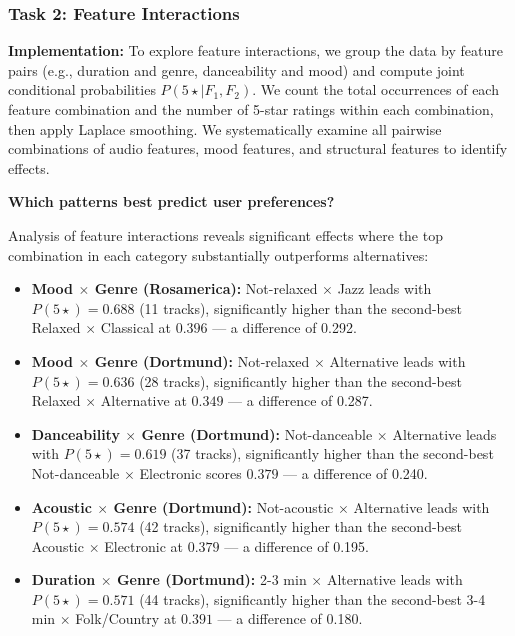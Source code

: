 \documentclass[12pt,a4paper]{article}
\begin{document}
\subsubsection{Task 2: Feature Interactions}

\textbf{Implementation:} To explore feature interactions, we group the data by feature pairs (e.g., duration and genre, danceability and mood) and compute joint conditional probabilities $P(5\star \mid F_1, F_2)$. We count the total occurrences of each feature combination and the number of 5-star ratings within each combination, then apply Laplace smoothing. We systematically examine all pairwise combinations of audio features, mood features, and structural features to identify effects.

\textbf{Which patterns best predict user preferences?}

Analysis of feature interactions reveals significant effects where the top combination in each category substantially outperforms alternatives:

\begin{itemize}
    \item \textbf{Mood $\times$ Genre (Rosamerica):} Not-relaxed $\times$ Jazz leads with $P(5\star) = 0.688$ (11 tracks), significantly higher than the second-best Relaxed $\times$ Classical at $0.396$ --- a difference of 0.292.
    
    \item \textbf{Mood $\times$ Genre (Dortmund):} Not-relaxed $\times$ Alternative leads with $P(5\star) = 0.636$ (28 tracks), significantly higher than the second-best Relaxed $\times$ Alternative at $0.349$ --- a difference of 0.287.
    
    \item \textbf{Danceability $\times$ Genre (Dortmund):} Not-danceable $\times$ Alternative leads with $P(5\star) = 0.619$ (37 tracks), significantly higher than the second-best Not-danceable $\times$ Electronic scores $0.379$ --- a difference of 0.240.
    
    \item \textbf{Acoustic $\times$ Genre (Dortmund):} Not-acoustic $\times$ Alternative leads with $P(5\star) = 0.574$ (42 tracks), significantly higher than the second-best Acoustic $\times$ Electronic at $0.379$ --- a difference of 0.195.
    
    \item \textbf{Duration $\times$ Genre (Dortmund):} 2-3 min $\times$ Alternative leads with $P(5\star) = 0.571$ (44 tracks), significantly higher than the second-best 3-4 min $\times$ Folk/Country at $0.391$ --- a difference of 0.180.
\end{itemize}
\end{document}

